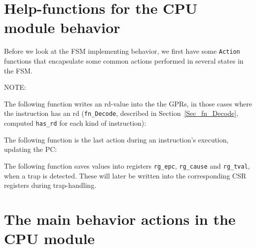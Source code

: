 \section{Help-functions for the {\DRUM} CPU module behavior}

\label{Sec_Drum_FSM_help_fns}

Before we look at the FSM implementing {\DRUM} behavior, we first have
some \verb|Action| functions that encapsulate some common actions
performed in several states in the FSM.

\vspace{2ex}

NOTE: 

\vspace{1ex}

The following function writes an rd-value into the the GPRs, in those
cases where the instruction has an rd (\verb|fn_Decode|, described in
Section~\ref{Sec_fn_Decode}, computed \verb|has_rd| for each kind of
instruction):


The following function is the last action during an instruction's
execution, updating the PC:


The following function saves values into registers \verb|rg_epc|,
\verb|rg_cause| and \verb|rg_tval|, when a trap is detected.  These
will later be written into the corresponding CSR registers during
trap-handling.



\section{The main behavior actions in the {\DRUM} CPU module}

\label{Sec_Drum_actions}


